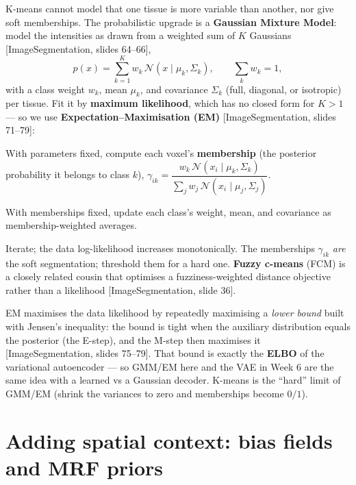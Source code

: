 \documentclass[11pt]{article}
\newcommand{\deck}[1]{\textsf{\small[#1]}}
\begin{document}
K-means cannot model that one tissue is more variable than another, nor give soft
memberships. The probabilistic upgrade is a \textbf{Gaussian Mixture Model}: model
the intensities as drawn from a weighted sum of $K$ Gaussians
\deck{ImageSegmentation, slides 64--66},
\[
p(x) = \sum_{k=1}^{K} w_k\,\mathcal{N}(x\mid \mu_k,\Sigma_k),
\qquad \sum_k w_k = 1,
\]
with a class weight $w_k$, mean $\mu_k$, and covariance $\Sigma_k$ (full,
diagonal, or isotropic) per tissue. Fit it by \textbf{maximum likelihood}, which
has no closed form for $K>1$ --- so we use \textbf{Expectation--Maximisation (EM)}
\deck{ImageSegmentation, slides 71--79}:
\begin{description}[leftmargin=*,nosep]
  \item[\textbf{E-step.}] With parameters fixed, compute each voxel's
  \textbf{membership} (the posterior probability it belongs to class $k$),
  $\gamma_{ik}=\dfrac{w_k\,\mathcal{N}(x_i\mid\mu_k,\Sigma_k)}{\sum_j w_j\,\mathcal{N}(x_i\mid\mu_j,\Sigma_j)}$.
  \item[\textbf{M-step.}] With memberships fixed, update each class's weight, mean,
  and covariance as membership-weighted averages.
\end{description}
Iterate; the data log-likelihood increases monotonically. The memberships
$\gamma_{ik}$ \emph{are} the soft segmentation; threshold them for a hard one.
\textbf{Fuzzy c-means} (FCM) is a closely related cousin that optimises a
fuzziness-weighted distance objective rather than a likelihood
\deck{ImageSegmentation, slide 36}.

\begin{notebox}
EM maximises the data likelihood by repeatedly maximising a \emph{lower bound}
built with Jensen's inequality: the bound is tight when the auxiliary
distribution equals the posterior (the E-step), and the M-step then maximises it
\deck{ImageSegmentation, slides 75--79}. That bound is exactly the
\textbf{ELBO} of the variational autoencoder --- so GMM/EM here and the VAE in
Week 6 are the same idea with a learned vs a Gaussian decoder. K-means is the
``hard'' limit of GMM/EM (shrink the variances to zero and memberships become
$0/1$).
\end{notebox}

\section{Adding spatial context: bias fields and MRF priors}
\end{document}
